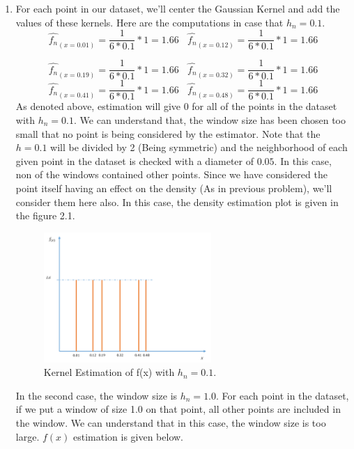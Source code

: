 \documentclass[12pt]{article}
\numberwithin{equation}{section}
\numberwithin{table}{section}
\numberwithin{figure}{section}
\begin{document}
\begin{enumerate}[label=(\alph*)]
	\item For each point in our dataset, we'll center the Gaussian Kernel and add the values of these kernels. Here are the computations in case that $h_n = 0.1$.
	$$
	\hat{f_n}_{(x = 0.01)} = \frac{1}{6*0.1} *1  = 1.66 \ \ \ \ \hat{f_n}_{(x = 0.12)} = \frac{1}{6*0.1} * 1= 1.66
	$$

	$$
	\hat{f_n}_{(x = 0.19)} = \frac{1}{6*0.1} * 1 = 1.66 \ \ \ \ \hat{f_n}_{(x = 0.32)} = \frac{1}{6*0.1} * 1 = 1.66
	$$
	$$
	\hat{f_n}_{(x = 0.41)} = \frac{1}{6*0.1} * 1 = 1.66\ \ \ \ 	\hat{f_n}_{(x = 0.48)} = \frac{1}{6*0.1} * 1 = 1.66
	$$
	As denoted above, estimation will give 0 for all of the points in the dataset with $h_n = 0.1$. We can understand that, the window size has been chosen too small that no point is being considered by the estimator. Note that the $h = 0.1$ will be divided by 2 (Being symmetric) and the neighborhood of each given point in the dataset is checked with a diameter of $0.05$. In this case, non of the windows contained other points. Since we have considered the point itself having an effect on the density (As in previous problem), we'll consider them here also.
	In this case, the density estimation plot is given in the figure 2.1.
	\begin{figure}[!h]\centering
	\includegraphics[width=0.6\textwidth]{2_a_1.PNG}
	\caption{Kernel Estimation of f(x) with $h_n = 0.1$.}
	\label{pl1}
	\end{figure}
	
	In the second case, the window size is $h_n = 1.0$. For each point in the dataset, if we put a window of size 1.0 on that point, all other points are included in the window. We can understand that in this case, the window size is too large. $f(x)$ estimation is given below.
	

\end{enumerate}
\end{document}
